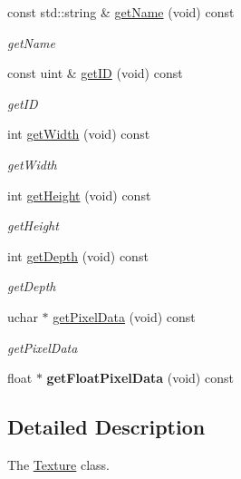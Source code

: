 \begin{DoxyCompactItemize}
\item 
const std\+::string \& \hyperlink{classEngine_1_1Texture_aad08aa5baa793d1912ba2503b96d6443}{get\+Name} (void) const 
\begin{DoxyCompactList}\small\item\em get\+Name \end{DoxyCompactList}\item 
const uint \& \hyperlink{classEngine_1_1Texture_a984928afb50d7b18e4220c70cae35d14}{get\+I\+D} (void) const 
\begin{DoxyCompactList}\small\item\em get\+I\+D \end{DoxyCompactList}\item 
int \hyperlink{classEngine_1_1Texture_a34521538335b3d644a16890be2727b65}{get\+Width} (void) const 
\begin{DoxyCompactList}\small\item\em get\+Width \end{DoxyCompactList}\item 
int \hyperlink{classEngine_1_1Texture_affa04ff498245c4d52800c2c3f114c74}{get\+Height} (void) const 
\begin{DoxyCompactList}\small\item\em get\+Height \end{DoxyCompactList}\item 
int \hyperlink{classEngine_1_1Texture_ab81e2d2bd373d31e6de2db6e371d748e}{get\+Depth} (void) const 
\begin{DoxyCompactList}\small\item\em get\+Depth \end{DoxyCompactList}\item 
uchar $\ast$ \hyperlink{classEngine_1_1Texture_a12e50ab269a49a5f87df19f87a40f4e0}{get\+Pixel\+Data} (void) const 
\begin{DoxyCompactList}\small\item\em get\+Pixel\+Data \end{DoxyCompactList}\item 
\hypertarget{classEngine_1_1Texture_abe9be33c19028eb35ab18ad912f94f98}{}float $\ast$ {\bfseries get\+Float\+Pixel\+Data} (void) const \label{classEngine_1_1Texture_abe9be33c19028eb35ab18ad912f94f98}

\end{DoxyCompactItemize}


\subsection{Detailed Description}
The \hyperlink{classEngine_1_1Texture}{Texture} class. 

